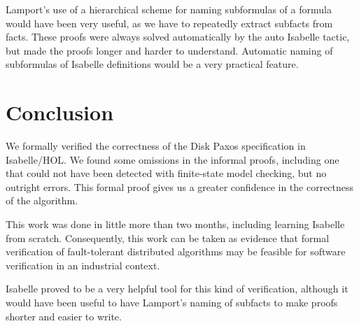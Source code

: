 Lamport's use of a hierarchical scheme for naming subformulas of a
formula would have been very useful, as we have to repeatedly extract
subfacts from facts. These proofs were always solved automatically by
the auto Isabelle tactic, but made the proofs longer and harder to
understand. Automatic naming of subformulas of Isabelle definitions
would be a very practical feature.

\notla

\section{Conclusion}\label{sec:Conclusion}

We formally verified the correctness of the Disk Paxos specification
in Isabelle/HOL. We found some omissions in the informal proofs, including
one that could not have been detected with finite-state model checking,
but no outright errors. This formal proof gives us a greater confidence
in the correctness of the algorithm. 

This work was done in little more than two months, including learning
Isabelle from scratch. Consequently, this work can be taken as evidence
that formal verification of fault-tolerant distributed algorithms
may be feasible for software verification in an industrial context.

Isabelle proved to be a very helpful tool for this kind of verification,
although it would have been useful to have Lamport's naming of subfacts
to make proofs shorter and easier to write.






